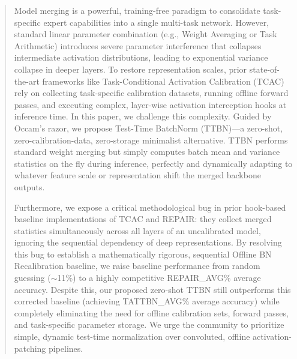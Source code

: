 \documentclass{article}
\theoremstyle{plain}
\theoremstyle{definition}
\theoremstyle{remark}
\begin{document}

\printAffiliationsAndNotice{}

\begin{abstract}
  Model merging is a powerful, training-free paradigm to consolidate task-specific expert capabilities into a single multi-task network. However, standard linear parameter combination (e.g., Weight Averaging or Task Arithmetic) introduces severe parameter interference that collapses intermediate activation distributions, leading to exponential variance collapse in deeper layers. To restore representation scales, prior state-of-the-art frameworks like Task-Conditional Activation Calibration (TCAC) rely on collecting task-specific calibration datasets, running offline forward passes, and executing complex, layer-wise activation interception hooks at inference time. In this paper, we challenge this complexity. Guided by Occam's razor, we propose Test-Time BatchNorm (TTBN)—a zero-shot, zero-calibration-data, zero-storage minimalist alternative. TTBN performs standard weight merging but simply computes batch mean and variance statistics on the fly during inference, perfectly and dynamically adapting to whatever feature scale or representation shift the merged backbone outputs. 
  
  Furthermore, we expose a critical methodological bug in prior hook-based baseline implementations of TCAC and REPAIR: they collect merged statistics simultaneously across all layers of an uncalibrated model, ignoring the sequential dependency of deep representations. By resolving this bug to establish a mathematically rigorous, sequential Offline BN Recalibration baseline, we raise baseline performance from random guessing ($\sim$11\%) to a highly competitive {{REPAIR_AVG}}\% average accuracy. Despite this, our proposed zero-shot TTBN still outperforms this corrected baseline (achieving {{TATTBN_AVG}}\% average accuracy) while completely eliminating the need for offline calibration sets, forward passes, and task-specific parameter storage. We urge the community to prioritize simple, dynamic test-time normalization over convoluted, offline activation-patching pipelines.
\end{abstract}
\end{document}
